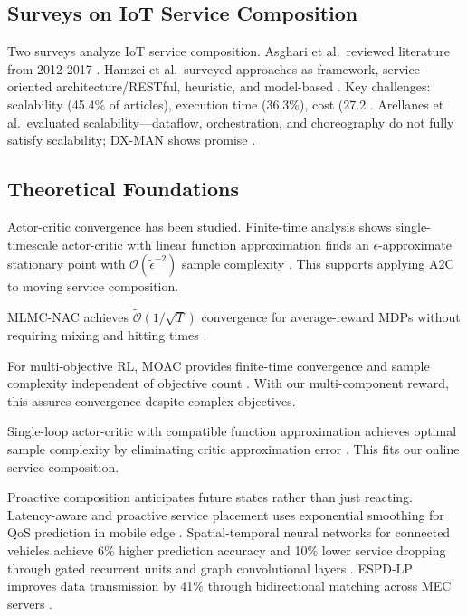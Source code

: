 \documentclass[10pt,twocolumn]{article}
\begin{document}
\subsection{Surveys on IoT Service Composition}\label{surveys-on-iot-service-composition}

Two surveys analyze IoT service composition. Asghari et al.~reviewed
literature from 2012-2017 \nocite{zhou2022}. Hamzei et al.~surveyed
approaches as framework, service-oriented architecture/RESTful,
heuristic, and model-based \nocite{tang2024}. Key challenges: scalability (45.4\% of
articles), execution time (36.3\%), cost (27.2%
\nocite{tang2024}. Arellanes et al.~evaluated scalability---dataflow,
orchestration, and choreography do not fully satisfy scalability; DX-MAN
shows promise \nocite{li2024}.

\subsection{Theoretical Foundations}\label{theoretical-foundations}

Actor-critic convergence has been studied. Finite-time analysis shows
single-timescale actor-critic with linear function approximation finds
an \(\epsilon\)-approximate stationary point with
\(\mathcal{O}(\tilde{\epsilon}^{-2})\) sample complexity \nocite{liu2022}. This
supports applying A2C to moving service composition.

MLMC-NAC achieves \(\tilde{\mathcal{O}}(1/\sqrt{T})\) convergence for
average-reward MDPs without requiring mixing and hitting times \nocite{liu2022}.

For multi-objective RL, MOAC provides finite-time convergence and sample
complexity independent of objective count \nocite{xu2024}. With our
multi-component reward, this assures convergence despite complex
objectives.

Single-loop actor-critic with compatible function approximation achieves
optimal sample complexity by eliminating critic approximation error
\nocite{liu2024b}. This fits our online service composition.

Proactive composition anticipates future states rather than just
reacting. Latency-aware and proactive service placement uses exponential
smoothing for QoS prediction in mobile edge \cite{huang2023}. Spatial-temporal
neural networks for connected vehicles achieve 6\% higher prediction
accuracy and 10\% lower service dropping through gated recurrent units
and graph convolutional layers \cite{chen2020}. ESPD-LP improves data
transmission by 41\% through bidirectional matching across MEC servers
\nocite{tang2024}.
\end{document}
